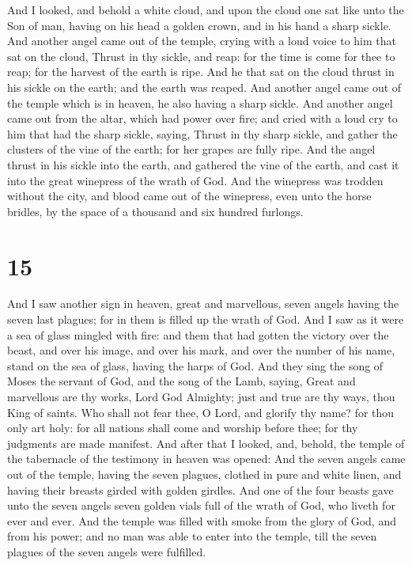  And I looked, and behold a white cloud, and upon the cloud
one sat like unto the Son of man, having on his head a golden crown, and
in his hand a sharp sickle.  And another angel came out of
the temple, crying with a loud voice to him that sat on the cloud,
Thrust in thy sickle, and reap: for the time is come for thee to reap;
for the harvest of the earth is ripe.  And he that sat on
the cloud thrust in his sickle on the earth; and the earth was reaped.
 And another angel came out of the temple which is in
heaven, he also having a sharp sickle.  And another angel
came out from the altar, which had power over fire; and cried with a
loud cry to him that had the sharp sickle, saying, Thrust in thy sharp
sickle, and gather the clusters of the vine of the earth; for her grapes
are fully ripe.  And the angel thrust in his sickle into
the earth, and gathered the vine of the earth, and cast it into the
great winepress of the wrath of God.  And the winepress was
trodden without the city, and blood came out of the winepress, even unto
the horse bridles, by the space of a thousand and six hundred furlongs.

\hypertarget{section-14}{%
\section{15}\label{section-14}}

 And I saw another sign in heaven, great and marvellous,
seven angels having the seven last plagues; for in them is filled up the
wrath of God.  And I saw as it were a sea of glass mingled
with fire: and them that had gotten the victory over the beast, and over
his image, and over his mark, and over the number of his name, stand on
the sea of glass, having the harps of God.  And they sing
the song of Moses the servant of God, and the song of the Lamb, saying,
Great and marvellous are thy works, Lord God Almighty; just and true are
thy ways, thou King of saints.  Who shall not fear thee, O
Lord, and glorify thy name? for thou only art holy: for all nations
shall come and worship before thee; for thy judgments are made manifest.
 And after that I looked, and, behold, the temple of the
tabernacle of the testimony in heaven was opened:  And the
seven angels came out of the temple, having the seven plagues, clothed
in pure and white linen, and having their breasts girded with golden
girdles.  And one of the four beasts gave unto the seven
angels seven golden vials full of the wrath of God, who liveth for ever
and ever.  And the temple was filled with smoke from the
glory of God, and from his power; and no man was able to enter into the
temple, till the seven plagues of the seven angels were fulfilled.

